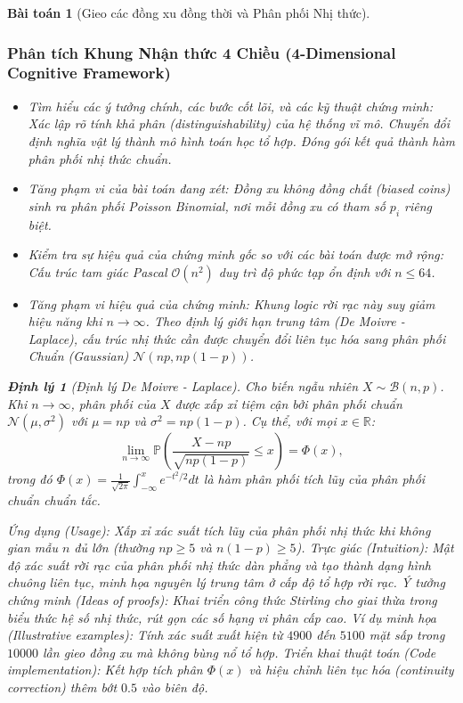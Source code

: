 \documentclass{article}
\newtheorem{baitoan}{Bài toán}
\newtheorem{dinhly}{Định lý}
\begin{document}
\begin{baitoan}[Gieo các đồng xu đồng thời và Phân phối Nhị thức]


 \subsubsection*{Phân tích Khung Nhận thức 4 Chiều (4-Dimensional Cognitive Framework)}
 \begin{itemize}
 \item \textit{Tìm hiểu các ý tưởng chính, các bước cốt lõi, và các kỹ thuật chứng minh}: Xác lập rõ tính khả phân (distinguishability) của hệ thống vĩ mô. Chuyển đổi định nghĩa vật lý thành mô hình toán học tổ hợp. Đóng gói kết quả thành hàm phân phối nhị thức chuẩn.
 \item \textit{Tăng phạm vi của bài toán đang xét}: Đồng xu không đồng chất (biased coins) sinh ra phân phối Poisson Binomial, nơi mỗi đồng xu có tham số $p_i$ riêng biệt.
 
  \item \textit{Kiểm tra sự hiệu quả của chứng minh gốc so với các bài toán được mở rộng}: Cấu trúc tam giác Pascal $\mathcal{O}(n^2)$ duy trì độ phức tạp ổn định với $n \le 64$.
 \item \textit{Tăng phạm vi hiệu quả của chứng minh}: Khung logic rời rạc này suy giảm hiệu năng khi $n \to \infty$. Theo định lý giới hạn trung tâm (De Moivre - Laplace), cấu trúc nhị thức cần được chuyển đổi liên tục hóa sang phân phối Chuẩn (Gaussian) $\mathcal{N}(np, np(1-p))$.
 \end{itemize}

\begin{dinhly}[Định lý De Moivre - Laplace]
Cho biến ngẫu nhiên $X \sim \mathcal{B}(n, p)$. Khi $n \to \infty$, phân phối của $X$ được xấp xỉ tiệm cận bởi phân phối chuẩn $\mathcal{N}(\mu, \sigma^2)$ với $\mu = np$ và $\sigma^2 = np(1-p)$. Cụ thể, với mọi $x \in \mathbb{R}$:
$$ \lim_{n \to \infty} \mathbb{P}\left(\frac{X - np}{\sqrt{np(1-p)}} \le x\right) = \Phi(x), $$
trong đó $\Phi(x) = \frac{1}{\sqrt{2\pi}} \int_{-\infty}^x e^{-t^2/2} dt$ là hàm phân phối tích lũy của phân phối chuẩn chuẩn tắc.
\end{dinhly}
\emph{Ứng dụng (Usage):} Xấp xỉ xác suất tích lũy của phân phối nhị thức khi không gian mẫu $n$ đủ lớn (thường $np \ge 5$ và $n(1-p) \ge 5$).
\emph{Trực giác (Intuition):} Mật độ xác suất rời rạc của phân phối nhị thức dàn phẳng và tạo thành dạng hình chuông liên tục, minh họa nguyên lý trung tâm ở cấp độ tổ hợp rời rạc.
\emph{Ý tưởng chứng minh (Ideas of proofs):} Khai triển công thức Stirling cho giai thừa trong biểu thức hệ số nhị thức, rút gọn các số hạng vi phân cấp cao.
\emph{Ví dụ minh họa (Illustrative examples):} Tính xác suất xuất hiện từ $4900$ đến $5100$ mặt sấp trong $10000$ lần gieo đồng xu mà không bùng nổ tổ hợp.
\emph{Triển khai thuật toán (Code implementation):} Kết hợp tích phân $\Phi(x)$ và hiệu chỉnh liên tục hóa (continuity correction) thêm bớt $0.5$ vào biên độ.

\end{baitoan}
\end{document}
